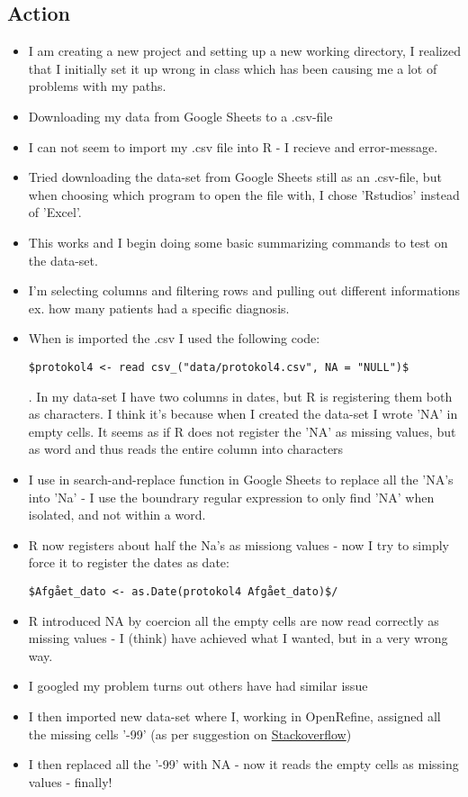 \documentclass{article}
\begin{document}
\subsection{Action}
\begin{itemize}
\item I am creating a new project and setting up a new working directory, I realized that I initially set it up wrong in class which has been causing me a lot of problems with my paths. 
\item Downloading my data from Google Sheets to a .csv-file
\item I can not seem to import my .csv file into R - I recieve and error-message. 
\item Tried downloading the data-set from Google Sheets still as an .csv-file, but when choosing which program to open the file with, I chose 'Rstudios' instead of 'Excel'. 
\item This works and I begin doing some basic summarizing commands to test on the data-set. 
\item I'm selecting columns and filtering rows and pulling out different informations ex. how many patients had a specific diagnosis.
\item When is imported the .csv I used the following code: \begin{lstlisting}
$protokol4 <- read csv_("data/protokol4.csv", NA = "NULL")$\end{lstlisting}. In my data-set I have two columns in dates, but R is registering them both as characters. I think it's because when I created the data-set I wrote 'NA' in empty cells. It seems as if R does not register the 'NA' as missing values, but as word and thus reads the entire column into characters
\item I use in search-and-replace function in Google Sheets to replace all the 'NA's into 'Na' - I use the boundrary regular expression to only find 'NA' when  isolated, and not within a word. 
\item R now registers about half the Na's as missiong values - now I try to simply force it to register the dates as date: \begin{lstlisting}$Afgået_dato <- as.Date(protokol4 Afgået_dato)$/\end{lstlisting}
\item R introduced NA by coercion all the empty cells are now  read correctly as missing values - I (think) have achieved what I wanted, but in a very wrong way. 
\item I googled my problem turns out others have had similar issue
\item I then imported new data-set where I, working in OpenRefine, assigned all the missing cells '-99' (as per suggestion on \href{https://stackoverflow.com/questions/49120151/r-not-detecting-missing-values}{Stackoverflow})
\item I then replaced all the '-99' with NA - now it reads the empty cells as missing values - finally!
\end{itemize}
\end{document}
